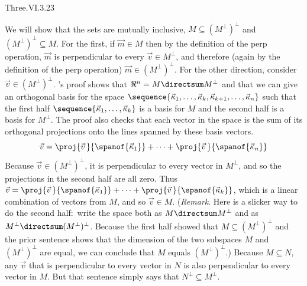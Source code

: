 \begin{ans}{Three.VI.3.23}
      \begin{exparts}
        \partsitem
          We will show that the sets are mutually inclusive,
          $M\subseteq (M^\perp)^\perp$ and $(M^\perp)^\perp \subseteq M$.
          For the first,
          if $\vec{m}\in M$ then by the definition of the perp operation,
          $\vec{m}$ is perpendicular to every $\vec{v}\in M^\perp$,
          and therefore (again by the definition of the perp operation)
          $\vec{m}\in (M^\perp)^\perp$.
          For the other direction, consider $\vec{v}\in (M^\perp)^\perp$.
          's proof shows that
          $\Re^n=M\directsum M^\perp$ and that
          we can give an orthogonal basis for the space
          $\sequence{\vec{\kappa}_1,\dots,\vec{\kappa}_k,
                        \vec{\kappa}_{k+1},\dots,\vec{\kappa}_n}$
          such that the first half
          $\sequence{\vec{\kappa}_1,\dots,\vec{\kappa}_k}$ is a basis for
          $M$ and the second half is a basis for $M^\perp$.
          The proof also checks that
          each vector in the space is the sum of its orthogonal projections
          onto the lines spanned by these basis vectors.
          \begin{equation*}
             \vec{v}=\proj{\vec{v}\,}{\spanof{\vec{\kappa}_1}}
                          +\dots+\proj{\vec{v}\,}{\spanof{\vec{\kappa}_n}}
          \end{equation*}
          Because $\vec{v}\in (M^\perp)^\perp$, it is perpendicular to
          every vector in $M^\perp$, and so the projections in
          the second half are all zero.
          Thus $\vec{v}=\proj{\vec{v}\,}{\spanof{\vec{\kappa}_1}}
                          +\dots+\proj{\vec{v}\,}{\spanof{\vec{\kappa}_k}}$,
          which is a linear combination of vectors from $M$, and
          so $\vec{v}\in M$.
          (\textit{Remark}.
           Here is a slicker way to do the second half:~write the space
           both as $M\directsum M^\perp$ and as
           $M^\perp\directsum (M^\perp)^\perp$.
           Because the first half showed that $M\subseteq (M^\perp)^\perp$
           and the prior sentence shows that the dimension of the two
           subspaces $M$ and $(M^\perp)^\perp$ are equal, we can conclude
           that $M$ equals $(M^\perp)^\perp$.)
        \partsitem Because $M\subseteq N$, any $\vec{v}$ that is perpendicular
           to every vector in $N$ is also perpendicular to every vector in
           $M$.
           But that sentence simply says that $N^\perp\subseteq M^\perp$.

\end{exparts}
\end{ans}
